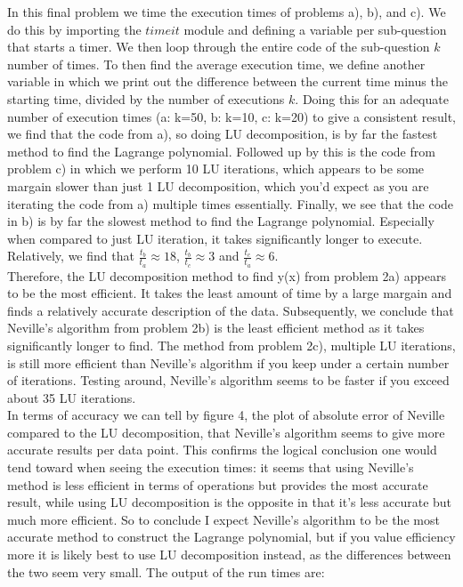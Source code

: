 In this final problem we time the execution times of problems a), b), and c). We do this by importing the $\textit{timeit}$ module and defining a variable per sub-question that starts a timer. We then loop through the entire code of the sub-question $k$ number of times. To then find the average execution time, we define another variable in which we print out the difference between the current time minus the starting time, divided by the number of executions $k$. Doing this for an adequate number of execution times (a: k=50, b: k=10, c: k=20) to give a consistent result, we find that the code from a), so doing LU decomposition, is by far the fastest method to find the Lagrange polynomial. Followed up by this is the code from problem c) in which we perform 10 LU iterations, which appears to be some margain slower than just 1 LU decomposition, which you'd expect as you are iterating the code from a) multiple times essentially. Finally, we see that the code in b) is by far the slowest method to find the Lagrange polynomial. Especially when compared to just LU iteration, it takes significantly longer to execute. Relatively, we find that $\frac{t_b}{t_a} \approx 18$, $\frac{t_b}{t_c} \approx 3$ and $\frac{t_c}{t_a} \approx 6$.\\

Therefore, the LU decomposition method to find y(x) from problem 2a) appears to be the most efficient. It takes the least amount of time by a large margain and finds a relatively accurate description of the data. Subsequently, we conclude that Neville's algorithm from problem 2b) is the least efficient method as it takes significantly longer to find. The method from problem 2c), multiple LU iterations, is still more efficient than Neville's algorithm if you keep under a certain number of iterations. Testing around, Neville's algorithm seems to be faster if you exceed about 35 LU iterations.\\

In terms of accuracy we can tell by figure 4, the plot of absolute error of Neville compared to the LU decomposition, that Neville's algorithm seems to give more accurate results per data point. This confirms the logical conclusion one would tend toward when seeing the execution times: it seems that using Neville's method is less efficient in terms of operations but provides the most accurate result, while using LU decomposition is the opposite in that it's less accurate but much more efficient. So to conclude I expect Neville's algorithm to be the most accurate method to construct the Lagrange polynomial, but if you value efficiency more it is likely best to use LU decomposition instead, as the differences between the two seem very small. The output of the run times are:\\


